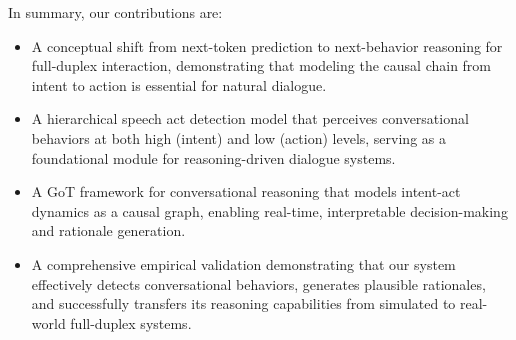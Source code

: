In summary, our contributions are:
{%
\setlength{\topsep}{0pt}
\setlength{\itemsep}{0pt}
\setlength{\parskip}{0pt}
\setlength{\parsep}{0pt}
\setlength{\partopsep}{0pt} 
\begin{itemize}
    \item A conceptual shift from next-token prediction to next-behavior reasoning for full-duplex interaction, demonstrating that modeling the causal chain from intent to action is essential for natural dialogue.
    
    \item A hierarchical speech act detection model that perceives conversational behaviors at both high (intent) and low (action) levels, serving as a foundational module for reasoning-driven dialogue systems.
    
    \item A GoT framework for conversational reasoning that models intent-act dynamics as a causal graph, enabling real-time, interpretable decision-making and rationale generation.
    
    \item A comprehensive empirical validation demonstrating that our system effectively detects conversational behaviors, generates plausible rationales, and successfully transfers its reasoning capabilities from simulated to real-world full-duplex systems.
\end{itemize}
}%
